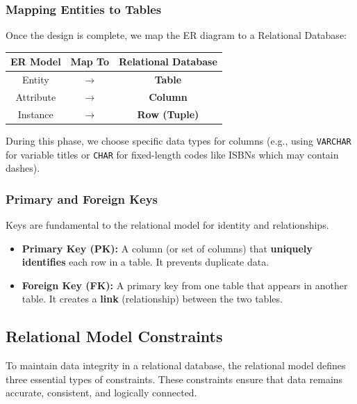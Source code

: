 \documentclass{article}
\begin{document}
\subsubsection{Mapping Entities to Tables}
Once the design is complete, we map the ER diagram to a Relational Database:

\begin{center}
\begin{tabular}{| c | c | c |}
\hline
\textbf{ER Model} & \textbf{Map To} & \textbf{Relational Database} \\
\hline
Entity & $\rightarrow$ & \textbf{Table} \\
\hline
Attribute & $\rightarrow$ & \textbf{Column} \\
\hline
Instance & $\rightarrow$ & \textbf{Row (Tuple)} \\
\hline
\end{tabular}
\end{center}

During this phase, we choose specific data types for columns (e.g., using \texttt{VARCHAR} for variable titles or \texttt{CHAR} for fixed-length codes like ISBNs which may contain dashes).

\subsubsection{Primary and Foreign Keys}
Keys are fundamental to the relational model for identity and relationships.

\begin{itemize}
    \item \textbf{Primary Key (PK):} A column (or set of columns) that \textbf{uniquely identifies} each row in a table. It prevents duplicate data.
    \item \textbf{Foreign Key (FK):} A primary key from one table that appears in another table. It creates a \textbf{link} (relationship) between the two tables.
\end{itemize}

\subsection{Relational Model Constraints}

To maintain data integrity in a relational database, the relational model defines three essential types of constraints. These constraints ensure that data remains accurate, consistent, and logically connected.
\end{document}
